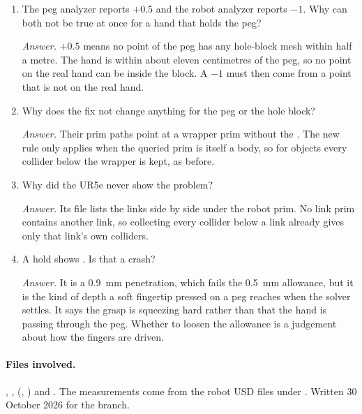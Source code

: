 \begin{enumerate}[leftmargin=1.6em]
  \item The peg analyzer reports $+0.5$ and the robot analyzer reports $-1$. Why can both not be true at once for a hand that holds the peg?

  \emph{Answer.} $+0.5$ means no point of the peg has any hole-block mesh within half a metre. The hand is within about eleven centimetres of the peg, so no point on the real hand can be inside the block. A $-1$ must then come from a point that is not on the real hand.
  \item Why does the fix not change anything for the peg or the hole block?

  \emph{Answer.} Their prim paths point at a wrapper prim without the . The new rule only applies when the queried prim is itself a body, so for objects every collider below the wrapper is kept, as before.
  \item Why did the UR5e never show the problem?

  \emph{Answer.} Its file lists the links side by side under the robot prim. No link prim contains another link, so collecting every collider below a link already gives only that link's own colliders.
  \item A hold shows . Is that a crash?

  \emph{Answer.} It is a 0.9~mm penetration, which fails the 0.5~mm allowance, but it is the kind of depth a soft fingertip pressed on a peg reaches when the solver settles. It says the grasp is squeezing hard rather than that the hand is passing through the peg. Whether to loosen the allowance is a judgement about how the fingers are driven.
\end{enumerate}

\paragraph{Files involved.} , ,  (, ) and . The measurements come from the robot USD files under . Written 30 October 2026 for the  branch.
